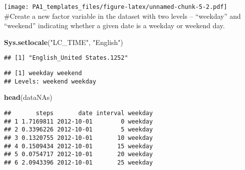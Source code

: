 \documentclass[
]{article}
\newenvironment{Shaded}{\begin{snugshade}}{\end{snugshade}}
\newcommand{\DataTypeTok}[1]{\textcolor[rgb]{0.13,0.29,0.53}{#1}}
\newcommand{\KeywordTok}[1]{\textcolor[rgb]{0.13,0.29,0.53}{\textbf{#1}}}
\newcommand{\NormalTok}[1]{#1}
\newcommand{\OperatorTok}[1]{\textcolor[rgb]{0.81,0.36,0.00}{\textbf{#1}}}
\newcommand{\OtherTok}[1]{\textcolor[rgb]{0.56,0.35,0.01}{#1}}
\newcommand{\StringTok}[1]{\textcolor[rgb]{0.31,0.60,0.02}{#1}}
\begin{document}
\texttt{[image: PA1\_templates\_files/figure-latex/unnamed-chunk-5-2.pdf]}
\#Create a new factor variable in the dataset with two levels --
``weekday'' and ``weekend'' indicating whether a given date is a weekday
or weekend day.

\begin{Shaded}
\begin{Highlighting}[]
\KeywordTok{Sys.setlocale}\NormalTok{(}\StringTok{"LC_TIME"}\NormalTok{, }\StringTok{"English"}\NormalTok{)}
\end{Highlighting}
\end{Shaded}

\begin{verbatim}
## [1] "English_United States.1252"
\end{verbatim}

\begin{Shaded}
\end{Shaded}

\begin{verbatim}
## [1] weekday weekend
## Levels: weekend weekday
\end{verbatim}

\begin{Shaded}
\begin{Highlighting}[]
\KeywordTok{head}\NormalTok{(dataNAs)}
\end{Highlighting}
\end{Shaded}

\begin{verbatim}
##       steps       date interval weekday
## 1 1.7169811 2012-10-01        0 weekday
## 2 0.3396226 2012-10-01        5 weekday
## 3 0.1320755 2012-10-01       10 weekday
## 4 0.1509434 2012-10-01       15 weekday
## 5 0.0754717 2012-10-01       20 weekday
## 6 2.0943396 2012-10-01       25 weekday
\end{verbatim}
\end{document}
